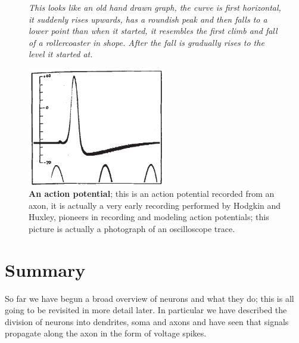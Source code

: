 \documentclass[12pt]{article}
\begin{document}
\begin{figure}[tbhp]
{\textsl{This looks like an old hand drawn graph, the curve is first horizontal, it suddenly rises upwards, has a roundish peak and then falls to a lower point than when it started, it resembles the first climb and fall of a rollercoaster in shope. After the fall is gradually rises to the level it started at.}}
{
  \begin{center}
  \includegraphics[width=6cm]{action_potential.jpg}
  \end{center}
  }
  \caption{\textbf{An action potential}; this is an action potential
    recorded from an axon, it is actually a very early recording
    performed by Hodgkin and Huxley, pioneers in recording and
    modeling action potentials; this picture is actually a photograph
    of an oscilloscope trace. \label{fig_hh}}
\end{figure}

\section{Summary}

So far we have begun a broad overview of neurons and what they do;
this is all going to be revisited in more detail later. In particular
we have described the division of neurons into dendrites, soma and
axons and have seen that signals propagate along the axon in the form
of voltage spikes.
\end{document}
